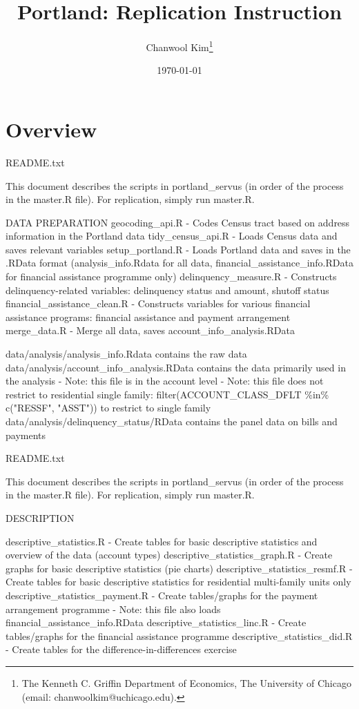 \documentclass[12pt]{article}
\begin{document}
\title{Portland: Replication Instruction}
\author{Chanwool Kim\thanks{The Kenneth C. Griffin Department of Economics, The University of Chicago (email: chanwoolkim@uchicago.edu).}}
\date{\today}
\maketitle

\section*{Overview}
README.txt

This document describes the scripts in portland\_servus (in order of the process in the master.R file). For replication, simply run master.R.


DATA PREPARATION
geocoding\_api.R
- Codes Census tract based on address information in the Portland data
tidy\_census\_api.R
- Loads Census data and saves relevant variables
setup\_portland.R
- Loads Portland data and saves in the .RData format (analysis\_info.Rdata for all data, financial\_assistance\_info.RData for financial assistance programme only)
delinquency\_measure.R
- Constructs delinquency-related variables: delinquency status and amount, shutoff status
financial\_assistance\_clean.R
- Constructs variables for various financial assistance programs: financial assistance and payment arrangement
merge\_data.R
- Merge all data, saves account\_info\_analysis.RData

data/analysis/analysis\_info.Rdata contains the raw data
data/analysis/account\_info\_analysis.RData contains the data primarily used in the analysis
- Note: this file is in the account level
- Note: this file does not restrict to residential single family: filter(ACCOUNT\_CLASS\_DFLT \%in\% c("RESSF", "ASST")) to restrict to single family
data/analysis/delinquency\_status/RData contains the panel data on bills and payments




README.txt

This document describes the scripts in portland\_servus (in order of the process in the master.R file). For replication, simply run master.R.


DESCRIPTION

descriptive\_statistics.R
- Create tables for basic descriptive statistics and overview of the data (account types)
descriptive\_statistics\_graph.R
- Create graphs for basic descriptive statistics (pie charts)
descriptive\_statistics\_resmf.R
- Create tables for basic descriptive statistics for residential multi-family units only
descriptive\_statistics\_payment.R
- Create tables/graphs for the payment arrangement programme
- Note: this file also loads financial\_assistance\_info.RData
descriptive\_statistics\_linc.R
- Create tables/graphs for the financial assistance programme
descriptive\_statistics\_did.R
- Create tables for the difference-in-differences exercise
\end{document}
